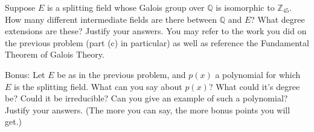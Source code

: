 \documentclass[11pt]{exam}
\def\Z{\mathbb Z}
\def\Q{\mathbb Q}
\begin{document}
\begin{questions}
\begin{parts}
\end{parts}

\question[6] Suppose $E$ is a splitting field whose Galois group over $\Q$ is isomorphic to $\Z_{45}$.  How many different intermediate fields are there between $\Q$ and $E$?  What degree extensions are these?  Justify your answers.  You may refer to the work you did on the previous problem (part (c) in particular) as well as reference the Fundamental Theorem of Galois Theory.

\bonusquestion[10] Bonus: Let $E$ be as in the previous problem, and $p(x)$ a polynomial for which $E$ is the splitting field.  What can you say about $p(x)$?  What could it's degree be?  Could it be irreducible?  Can you give an example of such a polynomial?  Justify your answers.  (The more you can say, the more bonus points you will get.)

\end{questions}
\end{document}
